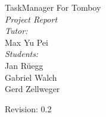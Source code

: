 \begin{titlepage}
\mbox{}
\vfill
\begin{center}
{\huge  TaskManager For Tomboy\\ \smallskip}
{\LARGE  {\em Project Report}\\}
\bigskip
\bigskip
{\Large {\em Tutor:\\}} {\large{Max Yu Pei\\}}
\bigskip
\bigskip
{\Large {\em Students:\\}} {\large Jan Rüegg\\ Gabriel Walch\\ Gerd Zellweger\\}

\bigskip
\bigskip
{\large Revision: 0.2}
\end{center}
\vfill
\end{titlepage}

\begin{titlepage}
\newpage
\tableofcontents
\newpage
\end{titlepage}
